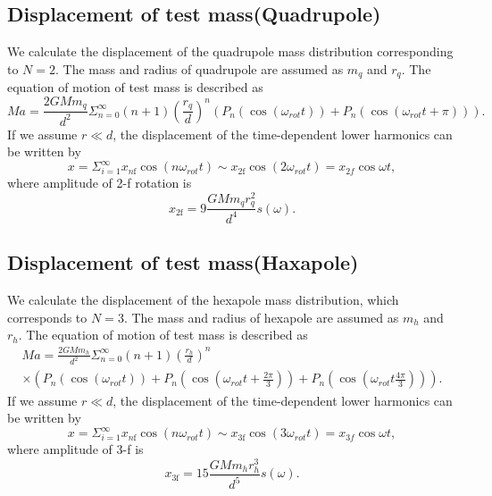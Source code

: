\documentclass[A4]{spie}  %
\begin{document}
\subsection{Displacement of test mass(Quadrupole)} \label{Quad}
We calculate the displacement of the quadrupole mass distribution corresponding to $N=2$.
The mass and radius of quadrupole are assumed as $m_q$ and $r_q$. 
The equation of motion of test mass is described as
\begin{equation}
Ma=\frac{2GMm_q}{d^2}\Sigma^{\infty}_{n=0}(n+1) \left( \frac{r_q}{d} \right)^n \left( P_n\left(\cos{\left(\omega_{rot} t \right)}\right) + P_n\left(\cos{\left(\omega_{rot} t +\pi \right)}\right) \right).
\end{equation} 
If we assume $r \ll d$, the displacement of the time-dependent lower harmonics can be written by 
\begin{equation}
x=\Sigma_{i=1}^{\infty}x_{n\mathrm{f}}\cos(n\omega_{rot} t)\sim x_{2\mathrm{f}}\cos(2\omega_{rot} t)=x_{2f}\cos{\omega t},
\end{equation}
where amplitude of 2-f rotation is
\begin{equation}
x_{2\mathrm{f}}=9\frac{GMm_{q}r_{q}^2}{d^4}s(\omega). \label{2f}
\end{equation}

\subsection{Displacement of test mass(Haxapole)} \label{Hexa}
We calculate the displacement of the hexapole mass distribution, which corresponds to $N=3$.
The mass and radius of hexapole are assumed as $m_h$ and $r_h$. 
The equation of motion of test mass is described as
\begin{eqnarray}
Ma = \frac{2GMm_h}{d^2}\Sigma^{\infty}_{n=0}(n+1) \left( \frac{r_h}{d} \right)^n \\
\times \left( P_n\left(\cos{\left(\omega_{rot} t \right)}\right) + P_n\left(\cos{\left(\omega_{rot} t+\frac{2\pi}{3} \right)} \right) + P_n\left(\cos{\left(\omega_{rot} t \frac{4\pi}{3} \right) }\right) \right).
\end{eqnarray} 
If we assume $r \ll d$, the displacement of the time-dependent lower harmonics can be written by 
\begin{equation}
x=\Sigma_{i=1}^{\infty}x_{n\mathrm{f}}\cos(n\omega_{rot} t)\sim  x_{3\mathrm{f}}\cos(3\omega_{rot} t)=x_{3f}\cos{\omega t},
\end{equation}
where amplitude of 3-f is
\begin{equation}
 x_{3\mathrm{f}}=15\frac{GMm_{h}r_{h}^3}{d^5}s(\omega). \label{3f}
\end{equation}
\end{document}
